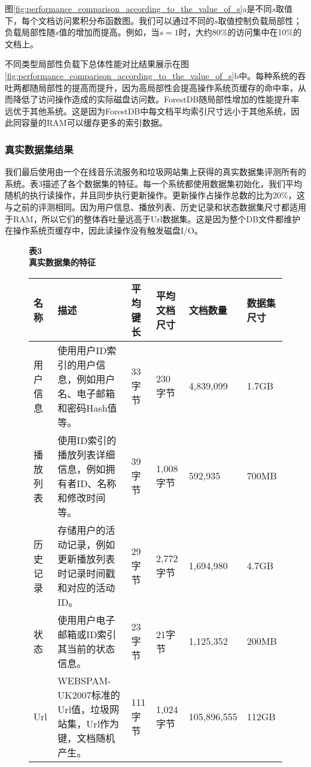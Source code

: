 图\ref{fig:performance_comparison_according_to_the_value_of_s}a是不同$s$取值下，每个文档访问累积分布函数图。我们可以通过不同的$s$取值控制负载局部性；负载局部性随$s$值的增加而提高。例如，当$s=1$时，大约80\%的访问集中在10\%的文档上。

不同类型局部性负载下总体性能对比结果展示在图\ref{fig:performance_comparison_according_to_the_value_of_s}b中。每种系统的吞吐两都随局部性的提高而提升，因为高局部性会提高操作系统页缓存的命中率，从而降低了访问操作造成的实际磁盘访问数。ForestDB随局部性增加的性能提升率远优于其他系统。这是因为ForestDB中每文档平均索引尺寸远小于其他系统，因此同容量的RAM可以缓存更多的索引数据。

\subsubsection{真实数据集结果}

我们最后使用由一个在线音乐流服务和垃圾网站集上获得的真实数据集评测所有的系统。表3描述了各个数据集的特征。每一个系统都使用数据集初始化，我们平均随机的执行读操作，并且同步执行更新操作。更新操作占操作总数的比为20\%，这与之前的评测相同。因为用户信息、播放列表、历史记录和状态数据集尺寸都适用于RAM，所以它们的整体吞吐量远高于Url数据集。这是因为整个DB文件都维护在操作系统页缓存中，因此读操作没有触发磁盘I/O。

\begin{figure}[htbp]
    \centering
    {
    \bfseries
    表3 \\
    真实数据集的特征 \\[1.5em]
    }
    \begin{tabular}{|p{4em}p{16em}p{4em}p{4em}p{4em}p{4em}|}
    \hline
    名称 & 描述 & 平均键长 & 平均文档尺寸 & 文档数量 & 数据集尺寸 \\
    \hline
    用户信息 & 使用用户ID索引的用户信息，例如用户名、电子邮箱和密码Hash值等。 & 33字节 & 230字节 & 4,839,099 & 1.7GB \\
    播放列表 & 使用ID索引的播放列表详细信息，例如拥有者ID、名称和修改时间等。 & 39字节 & 1,008字节 & 592,935 & 700MB \\
    历史记录 & 存储用户的活动记录，例如更新播放列表时记录时间戳和对应的活动ID。 & 29字节 & 2,772字节 & 1,694,980 & 4.7GB \\
    状态 & 使用用户电子邮箱或ID索引其当前的状态信息。 & 23字节 & 21字节 & 1,125,352 & 200MB \\
    Url & WEBSPAM-UK2007标准的Url值，垃圾网站集，Url作为键，文档随机产生。 & 111字节 & 1,024字节 & 105,896,555 & 112GB \\

    \hline
    \end{tabular}
\end{figure}

